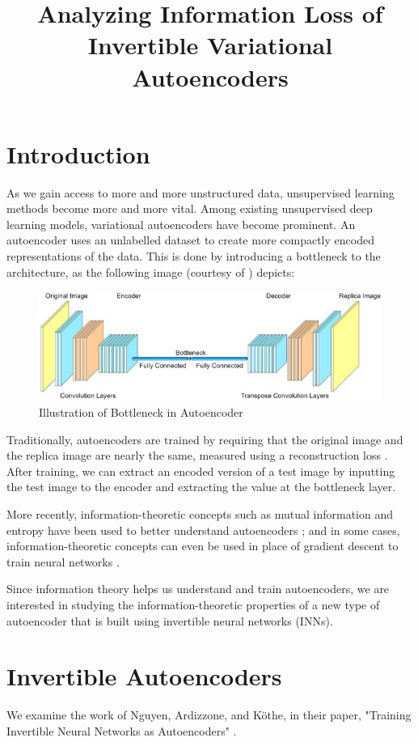 \documentclass[11pt,letterpaper]{article}
\title{Analyzing Information Loss of Invertible Variational Autoencoders}
\author{\name}
\begin{document}
\maketitle

\section{Introduction}
As we gain access to more and more unstructured data, unsupervised learning methods become more and more vital.
Among existing unsupervised deep learning models, variational autoencoders have become prominent.
An autoencoder uses an unlabelled dataset to create more compactly encoded representations of the data.
This is done by introducing a bottleneck to the architecture, as the following image (courtesy of \cite{bottleneck_picture}) depicts:
\begin{figure}[!htb]
\begin{center}
   \includegraphics[width=0.65\linewidth]{./pics/bottleneck.jpg}
   \caption{Illustration of Bottleneck in Autoencoder}
\end{center}
\end{figure}

Traditionally, autoencoders are trained by requiring that the original image and the replica image are nearly the same, measured using a reconstruction loss \cite{VAEtutorial}.
After training, we can extract an encoded version of a test image by inputting the test image to the encoder and extracting the value at the bottleneck layer.

More recently, information-theoretic concepts such as mutual information and entropy have been used to better understand autoencoders \cite{infotheoretic_vaes}; and in some cases, information-theoretic concepts can even be used in place of gradient descent to train neural networks \cite{deep_infomax}.

Since information theory helps us understand and train autoencoders, we are interested in studying the information-theoretic properties of a new type of autoencoder that is built using invertible neural networks (INNs).

\section{Invertible Autoencoders}
We examine the work of Nguyen, Ardizzone, and K\"{o}the, in their paper, "Training Invertible Neural Networks as Autoencoders" \cite{Nguyen2019}.
\end{document}
